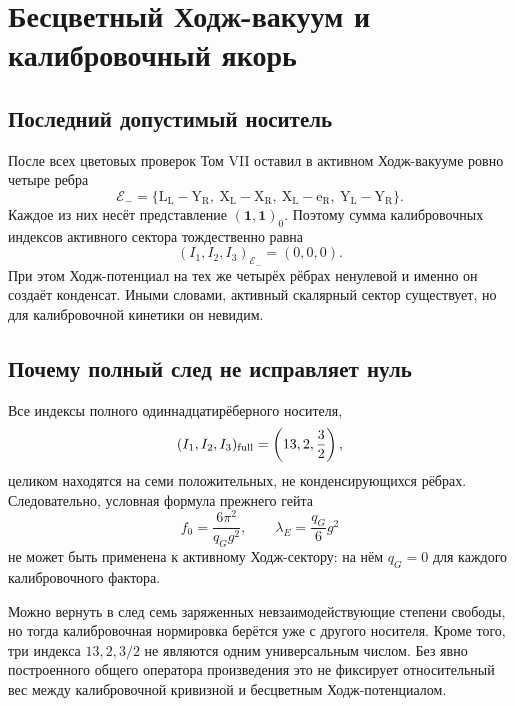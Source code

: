 \chapter{Бесцветный Ходж-вакуум и калибровочный якорь}
\label{ch:v8-colorless-hodge-gauge-anchor-no-go-gate}

\section{Последний допустимый носитель}

После всех цветовых проверок Том VII оставил в активном Ходж-вакууме ровно
четыре ребра
\begin{equation}
 \mathcal E_-=\{
 \mathrm{L_L-Y_R},\ \mathrm{X_L-X_R},\
 \mathrm{X_L-e_R},\ \mathrm{Y_L-Y_R}
 \}.
\end{equation}
Каждое из них несёт представление $(\mathbf1,\mathbf1)_0$. Поэтому сумма
калибровочных индексов активного сектора тождественно равна
\begin{equation}
 (I_1,I_2,I_3)_{\mathcal E_-}=(0,0,0).
 \label{eq:v8-active-gauge-index-zero}
\end{equation}
При этом Ходж-потенциал на тех же четырёх рёбрах ненулевой и именно он
создаёт конденсат. Иными словами, активный скалярный сектор существует, но
для калибровочной кинетики он невидим.

\section{Почему полный след не исправляет нуль}

Все индексы полного одиннадцатирёберного носителя,
\begin{equation}
 (I_1,I_2,I_3)_{\rm full}=\left(13,2,\frac32\right),
\end{equation}
целиком находятся на семи положительных, не конденсирующихся рёбрах.
Следовательно, условная формула прежнего гейта
\begin{equation}
 f_0=\frac{6\pi^2}{q_Gg^2},\qquad
 \lambda_E=\frac{q_G}{6}g^2
\end{equation}
не может быть применена к активному Ходж-сектору: на нём $q_G=0$ для
каждого калибровочного фактора.

Можно вернуть в след семь заряженных невзаимодействующие степени свободы, но тогда калибровочная
нормировка берётся уже с другого носителя. Кроме того, три индекса
$13,2,3/2$ не являются одним универсальным числом. Без явно построенного
общего оператора произведения это не фиксирует относительный вес между
калибровочной кривизной и бесцветным Ходж-потенциалом.


